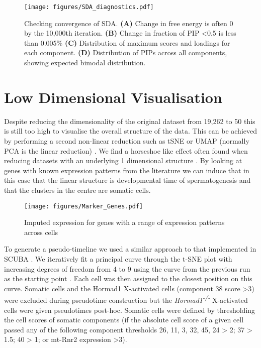 \begin{figure}[H]
	\centering
	\texttt{[image: figures/SDA\_diagnostics.pdf]}
	\caption{Checking convergence of SDA.
		\textbf{(A)} Change in free energy is often 0 by the 10,000th iteration.
		\textbf{(B)} Change in fraction of PIP <0.5 is less than 0.005\%
		\textbf{(C)} Distribution of maximum scores and loadings for each component.
		\textbf{(D)} Distribution of PIPs across all components, showing expected bimodal distribution.}
	\label{fig:SDA_diagnostics}
\end{figure}




\section{Low Dimensional Visualisation}

Despite reducing the dimensionality of the original dataset from 19,262 to 50 this is still too high to visualise the overall structure of the data. This can be achieved by performing a second non-linear reduction such as tSNE or UMAP (normally PCA is the linear reduction) \cite{Maaten2008Visualizing, McInnes2018UMAPa, Becht2018Dimensionality}. We find a horseshoe like effect often found when reducing datasets with an underlying 1 dimensional structure \cite{Novembre2008Interpreting, Podani2002RESEMBLANCE}. By looking at genes with known expression patterns from the literature we can induce that in this case that the linear structure is developmental time of spermatogenesis and that the clusters in the centre are somatic cells.
\begin{figure}[H]
	\centering
	\texttt{[image: figures/Marker\_Genes.pdf]}
	\caption{Imputed expression for genes with a range of expression patterns across cells}
	\label{fig:Marker_Genes}
\end{figure}

To generate a pseudo-timeline we used a similar approach to that implemented in SCUBA \cite{Marco2014Bifurcation}. We iteratively fit a principal curve through the t-SNE plot with increasing degrees of freedom from 4 to 9 using the curve from the previous run as the starting point \cite{Hastie1989Principal}. Each cell was then assigned to the closest position on this curve. Somatic cells and the Hormad1 X-activated cells (component 38 score >3) were excluded during pseudotime construction but the \textit{Hormad1\textsuperscript{-/-}} X-activated cells were given pseudotimes post-hoc. Somatic cells were defined by thresholding the cell scores of somatic components (if the absolute cell score of a given cell passed any of the following component thresholds 26, 11, 3, 32, 45, 24 > 2; 37 > 1.5; 40 > 1; or mt-Rnr2 expression >3).

